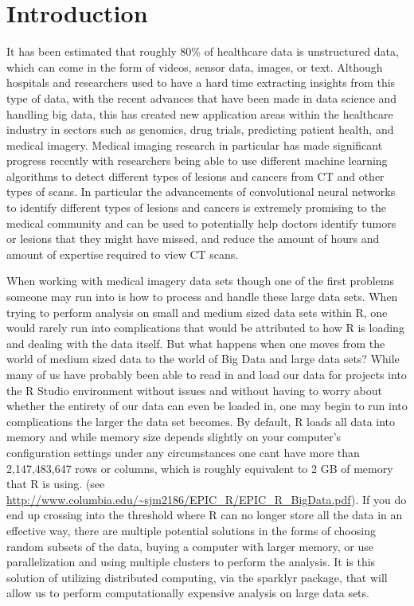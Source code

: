 \documentclass[12pt]{article}
\begin{document}
\newpage
{} %

\hypertarget{introduction}{%
\section{Introduction}\label{introduction}}

It has been estimated that roughly 80\% of healthcare data is
unstructured data, which can come in the form of videos, sensor data,
images, or text. Although hospitals and researchers used to have a hard
time extracting insights from this type of data, with the recent
advances that have been made in data science and handling big data, this
has created new application areas within the healthcare industry in
sectors such as genomics, drug trials, predicting patient health, and
medical imagery. Medical imaging research in particular has made
significant progress recently with researchers being able to use
different machine learning algorithms to detect different types of
lesions and cancers from CT and other types of scans. In particular the
advancements of convolutional neural networks to identify different
types of lesions and cancers is extremely promising to the medical
community and can be used to potentially help doctors identify tumors or
lesions that they might have missed, and reduce the amount of hours and
amount of expertise required to view CT scans.

When working with medical imagery data sets though one of the first
problems someone may run into is how to process and handle these large
data sets. When trying to perform analysis on small and medium sized
data sets within R, one would rarely run into complications that would
be attributed to how R is loading and dealing with the data itself. But
what happens when one moves from the world of medium sized data to the
world of Big Data and large data sets? While many of us have probably
been able to read in and load our data for projects into the R Studio
environment without issues and without having to worry about whether the
entirety of our data can even be loaded in, one may begin to run into
complications the larger the data set becomes. By default, R loads all
data into memory and while memory size depends slightly on your
computer's configuration settings under any circumstances one cant have
more than 2,147,483,647 rows or columns, which is roughly equivalent to
2 GB of memory that R is using. (see
\url{http://www.columbia.edu/~sjm2186/EPIC_R/EPIC_R_BigData.pdf}). If
you do end up crossing into the threshold where R can no longer store
all the data in an effective way, there are multiple potential solutions
in the forms of choosing random subsets of the data, buying a computer
with larger memory, or use parallelization and using multiple clusters
to perform the analysis. It is this solution of utilizing distributed
computing, via the sparklyr package, that will allow us to perform
computationally expensive analysis on large data sets.
\end{document}

